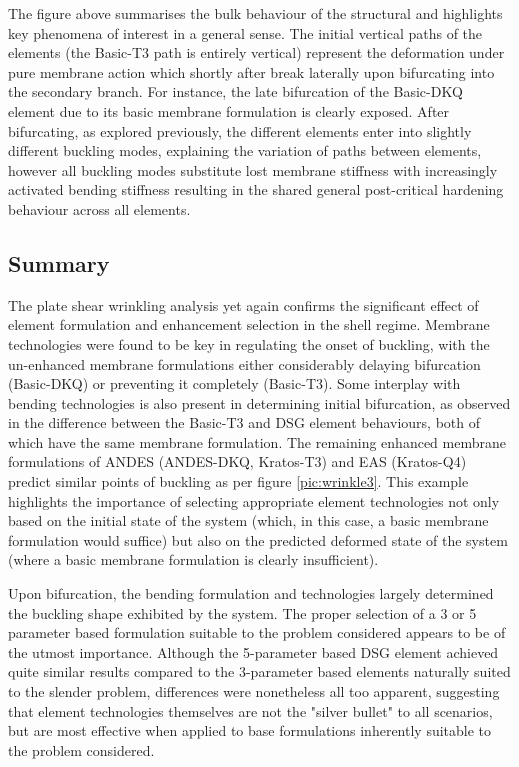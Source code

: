 The figure above summarises the bulk behaviour of the structural and highlights key phenomena of interest in a general sense. The initial vertical paths of the elements (the Basic-T3 path is entirely vertical) represent the deformation under pure membrane action which shortly after break laterally upon bifurcating into the secondary branch. For instance, the late bifurcation of the Basic-DKQ element due to its basic membrane formulation is clearly exposed. After bifurcating, as explored previously, the different elements enter into slightly different buckling modes, explaining the variation of paths between elements, however all buckling modes substitute lost membrane stiffness with increasingly activated bending stiffness resulting in the shared general post-critical hardening behaviour across all elements.

\subsection{Summary}

The plate shear wrinkling analysis yet again confirms the significant effect of element formulation and enhancement selection in the shell regime. Membrane technologies were found to be key in regulating the onset of buckling, with the un-enhanced membrane formulations either considerably delaying bifurcation (Basic-DKQ) or preventing it completely (Basic-T3). Some interplay with bending technologies is also present in determining initial bifurcation, as observed in the difference between the Basic-T3 and DSG element behaviours, both of which have the same membrane formulation. The remaining enhanced membrane formulations of ANDES (ANDES-DKQ, Kratos-T3) and EAS (Kratos-Q4) predict similar points of buckling as per figure \ref{pic:wrinkle3}. This example highlights the importance of selecting appropriate element technologies not only based on the initial state of the system (which, in this case, a basic membrane formulation would suffice) but also on the predicted deformed state of the system (where a basic membrane formulation is clearly insufficient).

 Upon bifurcation, the bending formulation and technologies largely determined the buckling shape exhibited by the system. The proper selection of a 3 or 5 parameter based formulation suitable to the problem considered appears to be of the utmost importance. Although the 5-parameter based DSG element achieved quite similar results compared to the 3-parameter based elements naturally suited to the slender problem, differences were nonetheless all too apparent, suggesting that element technologies themselves are not the "silver bullet" to all scenarios, but are most effective when applied to base formulations inherently suitable to the problem considered.
 
